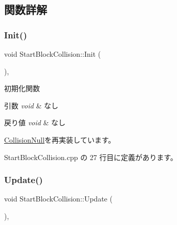 \subsection{関数詳解}
\mbox{\label{class_start_block_collision_a2ff4f4ba72b71c6083ce2b8ceb9c4e65}} 
\subsubsection{\texorpdfstring{Init()}{Init()}}
{\footnotesize\ttfamily void Start\+Block\+Collision\+::\+Init (\begin{DoxyParamCaption}{ }\end{DoxyParamCaption})\hspace{0.3cm}{\ttfamily [override]}, {\ttfamily [virtual]}}



初期化関数 


\begin{DoxyParams}{引数}
{\em void} & なし \\
\hline
\end{DoxyParams}

\begin{DoxyRetVals}{戻り値}
{\em void} & なし \\
\hline
\end{DoxyRetVals}


\mbox{\hyperlink{class_collision_null_a18cfc21fefcd3e8dec380ac44a85f111}{Collision\+Null}}を再実装しています。



 Start\+Block\+Collision.\+cpp の 27 行目に定義があります。

\mbox{\label{class_start_block_collision_a0e70da365db1a2bb07c56609d28217ad}} 
\subsubsection{\texorpdfstring{Update()}{Update()}}
{\footnotesize\ttfamily void Start\+Block\+Collision\+::\+Update (\begin{DoxyParamCaption}{ }\end{DoxyParamCaption})\hspace{0.3cm}{\ttfamily [override]}, {\ttfamily [virtual]}}



